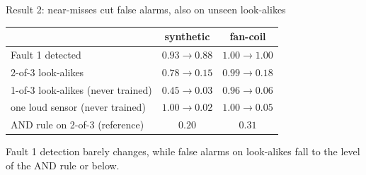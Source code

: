 \documentclass[aspectratio=169,9pt]{beamer}
\newcommand{\slidenotation}{}
\newcommand{\notation}[1]{\gdef\slidenotation{#1}}
\gdef\slidenotation{}%
\newcommand{\takeaway}[1]{\par{\color{Blue}\fontsize{9.5}{11.6}\selectfont #1\par}}
\renewcommand{\arraystretch}{1.1}
\begin{document}
\begin{frame}[t]{Result 2: near-misses cut false alarms, also on unseen look-alikes}
  \notation{numbers: share of windows flagged by the transformer, plain \(\to\) + near-misses, mean of 3 seeds \(\cdot\) never trained: these look-alikes were not in the training data \(\cdot\) 1\% false alarms on normal windows}
  \vspace{2mm}
  \begin{center}
  {\fontsize{9.6}{12}\selectfont\renewcommand{\arraystretch}{1.4}\setlength{\tabcolsep}{5mm}
  \begin{tabular}{@{}lcc@{}}
    \toprule
    & \textbf{synthetic} & \textbf{fan-coil}\\
    \midrule
    Fault 1 detected & \(0.93\to0.88\) & \(1.00\to1.00\)\\
    2-of-3 look-alikes & \(0.78\to\mathbf{0.15}\) & \(0.99\to\mathbf{0.18}\)\\
    1-of-3 look-alikes {\scriptsize\color{Muted}(never trained)} & \(0.45\to\mathbf{0.03}\) & \(0.96\to\mathbf{0.06}\)\\
    one loud sensor {\scriptsize\color{Muted}(never trained)} & \(1.00\to\mathbf{0.02}\) & \(1.00\to\mathbf{0.05}\)\\
    \midrule
    AND rule on 2-of-3 {\scriptsize\color{Muted}(reference)} & \(0.20\) & \(0.31\)\\
    \bottomrule
  \end{tabular}\par}
  \end{center}
  \vspace{3mm}
  \takeaway{Fault 1 detection barely changes, while false alarms on look-alikes fall to the level of the AND rule or below.}
\end{frame}
\end{document}
